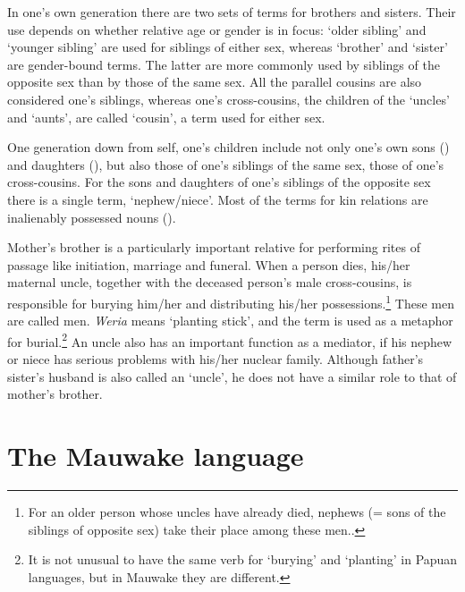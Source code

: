 In one's own generation there are two sets of terms for brothers and sisters. Their use  depends on whether relative age or gender is in focus:  `older sibling' and  `younger sibling' are used for siblings of either sex, whereas  `brother'  and  `sister' are gender-bound terms. The latter are more commonly used by siblings of the opposite sex than by those of the same sex. All the parallel cousins are also considered one's siblings, whereas one's cross-cousins, the children of the `uncles' and `aunts', are called  `cousin', a term used for either sex.

One generation down from self, one's children include not only one's own sons () and daughters (), but also those of one's siblings of the same sex,  those of one's cross-cousins. For the sons and daughters of one's siblings of the opposite sex there is a single term,  `nephew/niece'. Most of the terms for kin relations are inalienably possessed nouns (). 

Mother's brother is a particularly important relative for performing rites of passage like initiation, marriage and funeral. When a person dies, his/her maternal uncle, together with the deceased person's male cross-cousins, is responsible for burying him/her and distributing his/her possessions.\footnote{For an older person whose uncles have already died, nephews (= sons of the siblings of opposite sex) take their place among these men..} These men are called  men.  \textit{Weria} means `planting stick', and the term is used as a metaphor for burial.\footnote{It is not unusual to have the same verb for `burying' and `planting' in Papuan languages, but in Mauwake they are different.} An uncle also has an important function as a mediator, if his nephew or niece has serious problems with his/her nuclear family. Although father's sister's husband is also called an `uncle', he does not have a similar role to that of mother's brother.  

\section{The Mauwake language}
